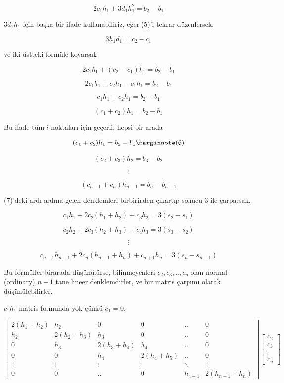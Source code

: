 \documentclass[12pt,fleqn]{article}\usepackage{../../common}
\begin{document}
$$  2c_1h_1 + 3d_1h_1^2  = b_2 - b_1$$

$3d_1h_1$ için başka bir ifade kullanabiliriz, eğer (5)'i tekrar
düzenlersek,

$$ 3h_1d_1 = c_2 - c_1$$

ve iki üstteki formüle koyarsak

$$  2c_1h_1 + (c_2 - c_1)h_1  = b_2 - b_1$$

$$  2c_1h_1 + c_2h_1 - c_1h_1  = b_2 - b_1$$

$$  c_1h_1 + c_2h_1  = b_2 - b_1$$

$$  (c_1 + c_2) h_1  = b_2 - b_1$$

Bu ifade tüm $i$ noktaları için geçerli, hepsi bir arada

$$  (c_1 + c_2) h_1  = b_2 - b_1 
\mlabel{6}$$

$$  (c_2 + c_3) h_2  = b_3 - b_2$$

$$ \vdots $$

$$  (c_{n-1} + c_n) h_{n-1}  = b_n - b_{n-1}$$

(7)'deki ardı ardına gelen denklemleri birbirinden çıkartıp sonucu 3 ile
çarparsak, 

$$ c_1h_1 + 2c_2(h_1 + h_2) + c_3h_2 = 3(s_2 - s_1) $$

$$ c_2h_2 + 2c_3(h_2 + h_3) + c_4h_3 = 3(s_3 - s_2) $$

$$ \vdots $$

$$ c_{n-1}h_{n-1} + 2c_n(h_{n-1} + h_{n}) + c_{n+1}h_n = 3(s_n - s_{n-1}) $$

Bu formüller birarada düşünülürse, bilinmeyenleri $c_2,c_3,..,c_n$ olan
normal (ordinary) $n-1$ tane lineer denklemdirler, ve bir matris çarpımı
olarak düşünülebilirler. 

$c_1h_1$ matris formunda yok çünkü $c_1=0$. 

$$ 
\left[\begin{array}{cccccc}
2(h_1+h_2) & h_2 & 0 & 0 & ... & 0 \\
h_2 & 2(h_2+h_3) & h_3 & 0 & .. & 0  \\
0 & h_3 & 2(h_3+h_4) & h_4 & .. & 0 \\
0 & 0 & h_4 & 2(h_4+h_5) & ... & 0 \\
\vdots & \vdots & \vdots & \vdots & \ddots & \vdots  \\
0 & 0 & .. & 0 & h_{n-1} & 2(h_{n-1}+h_n) 
\end{array}\right]
\left[\begin{array}{r}
c_2 \\ c_3 \\ \vdots \\ c_n
\end{array}\right]
 $$
\end{document}
